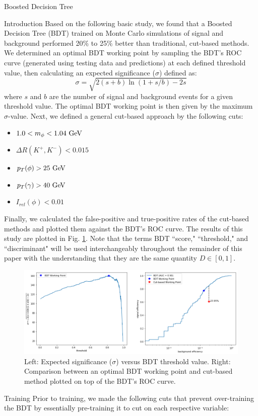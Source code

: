 \begin{section}{Boosted Decision Tree}
\begin{subsection}{Introduction}
Based on the following basic study, we found that a Boosted Decision Tree (BDT) trained on Monte Carlo simulations of signal and background performed 20\% to 25\% better than traditional, cut-based methods. We determined an optimal BDT working point by sampling the BDT's ROC curve (generated using testing data and predictions) at each defined threshold value, then calculating an expected significance ($\sigma$) defined as:
\begin{equation}
    \sigma = \sqrt{2(s+b)\ln(1+s/b)-2s}
\end{equation}
\noindent where $s$ and $b$ are the number of signal and background events for a given threshold value. The optimal BDT working point is then given by the maximum $\sigma$-value. Next, we defined a general cut-based approach by the following cuts:
\begin{itemize}
    \item $1.0 < m_{\phi} < 1.04\textnormal{ GeV}$
    \item $\Delta R(K^{+}, K^{-}) < 0.015$
    \item $p_{T}(\phi) > 25\textnormal{ GeV}$
    \item $p_{T}(\gamma) > 40\textnormal{ GeV}$
    \item $I_{rel}(\phi) < 0.01$
\end{itemize}
\noindent Finally, we calculated the false-positive and true-positive rates of the cut-based methods and plotted them against the BDT's ROC curve. The results of this study are plotted in Fig. \ref{fig:bdt-vs-cuts}. Note that the terms BDT ``score," ``threshold," and ``discriminant" will be used interchangeably throughout the remainder of this paper with the understanding that they are the same quantity $D \in [0,1]$.

\begin{figure}[htb]
\begin{center}
\includegraphics[width=.95\linewidth]{Dissertation/fig/bdt-vs-cuts.png}
\end{center}
\caption{Left: Expected significance ($\sigma$) versus BDT threshold value. Right: Comparison between an optimal BDT working point and cut-based method plotted on top of the BDT's ROC curve.}
\label{fig:bdt-vs-cuts}
\end{figure}
\end{subsection}
\begin{subsection}{Training}
Prior to training, we made the following cuts that prevent over-training the BDT by essentially pre-training it to cut on each respective variable:


\end{subsection}
\end{section}
